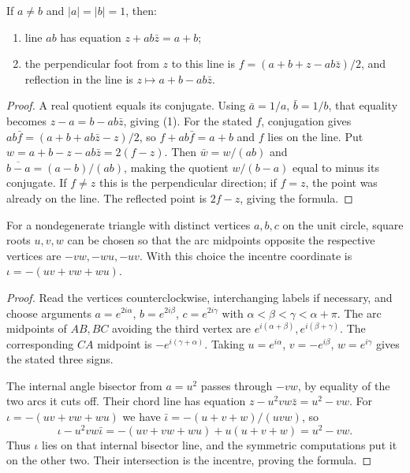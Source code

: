 \begin{lemma}\label{geometry:lem:chord}
If $a\ne b$ and $|a|=|b|=1$, then:
\begin{enumerate}
\item line $ab$ has equation $z+ab\bar z=a+b$;
\item the perpendicular foot from $z$ to this line is
$f=(a+b+z-ab\bar z)/2$, and reflection in the line is $z\mapsto a+b-ab\bar z$.
\end{enumerate}
\end{lemma}
\begin{proof}
A real quotient equals its conjugate. Using $\bar a=1/a$, $\bar b=1/b$, that equality becomes
$z-a=b-ab\bar z$, giving (1). For the stated $f$, conjugation gives
$ab\bar f=(a+b+ab\bar z-z)/2$, so $f+ab\bar f=a+b$ and $f$ lies on the line. Put $w=a+b-z-ab\bar z=2(f-z)$. Then $\bar w=w/(ab)$ and $\overline{b-a}=(a-b)/(ab)$, making the quotient $w/(b-a)$ equal to minus its conjugate. If $f\ne z$ this is the perpendicular direction; if $f=z$, the point was already on the line. The reflected point is $2f-z$, giving the formula.
\end{proof}

\begin{proposition}\label{geometry:prop:incentre}
For a nondegenerate triangle with distinct vertices $a,b,c$ on the unit circle, square roots $u,v,w$ can be chosen so that the arc midpoints opposite the respective vertices are $-vw,-wu,-uv$. With this choice the incentre coordinate is $\iota=-(uv+vw+wu)$.
\end{proposition}
\begin{proof}
Read the vertices counterclockwise, interchanging labels if necessary, and choose arguments $a=e^{2i\alpha}$, $b=e^{2i\beta}$, $c=e^{2i\gamma}$ with $\alpha<\beta<\gamma<\alpha+\pi$. The arc midpoints of $AB,BC$ avoiding the third vertex are $e^{i(\alpha+\beta)},e^{i(\beta+\gamma)}$. The corresponding $CA$ midpoint is $-e^{i(\gamma+\alpha)}$. Taking $u=e^{i\alpha}$, $v=-e^{i\beta}$, $w=e^{i\gamma}$ gives the stated three signs.

The internal angle bisector from $a=u^2$ passes through $-vw$, by equality of the two arcs it cuts off. Their chord line has equation $z-u^2vw\bar z=u^2-vw$. For $\iota=-(uv+vw+wu)$ we have $\bar\iota=-(u+v+w)/(uvw)$, so
\[
\iota-u^2vw\bar\iota
=-(uv+vw+wu)+u(u+v+w)=u^2-vw.
\]
Thus $\iota$ lies on that internal bisector line, and the symmetric computations put it on the other two. Their intersection is the incentre, proving the formula.
\end{proof}

